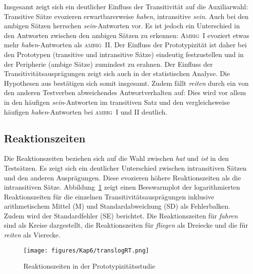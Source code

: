Insgesamt zeigt sich ein deutlicher Einfluss der Transitivität auf die Auxiliarwahl: Transitive Sätze evozieren erwartbarerweise \textit{haben}, intransitive \textit{sein}. Auch bei den ambigen Sätzen herrschen \textit{sein}-Antworten vor. Es ist jedoch ein Unterschied in den Antworten zwischen den ambigen Sätzen zu erkennen: \textsc{Ambig~I} evoziert etwas mehr \textit{haben}-Antworten als \textsc{ambig~II}. Der Einfluss der Prototypizität ist daher bei den Prototypen (transitive und intransitive Sätze) eindeutig festzustellen und in der Peripherie (ambige Sätze) zumindest zu erahnen. Der Einfluss der Transitivitätsausprägungen zeigt sich auch in der statistischen Analyse. Die Hypothesen aus  bestätigen sich somit insgesamt. Zudem fällt \textit{reiten} durch ein von den anderen Testverben abweichendes Antwortverhalten auf: Dies wird vor allem in den häufigen \textit{sein}-Antworten im transitiven Satz und den vergleichsweise häufigen \textit{haben}-Antworten bei \textsc{ambig}~\textsc{I} und \textsc{II} deutlich. 




\subsection{Reaktionszeiten}\label{rtprotokap}\largerpage[-1]

Die Reaktionszeiten beziehen sich auf die Wahl zwischen \textit{hat} und \textit{ist} in den Testsätzen. Es zeigt sich ein deutlicher Unterschied zwischen intransitiven Sätzen und den anderen Ausprägungen. Diese evozieren höhere Reaktionszeiten als die intransitiven Sätze. Abbildung~\ref{rtproto} zeigt einen Beeswarmplot der logarithmierten Reaktionszeiten für die einzelnen Transitivitätsausprägungen inklusive arithmetischem Mittel (M) und Standardabweichung (SD) als Fehlerbalken. Zudem wird der Standardfehler (SE) berichtet. Die Reaktionszeiten für \textit{fahren} sind als Kreise dargestellt, die Reaktionszeiten für \textit{fliegen} als Dreiecke und die für \textit{reiten} als Vierecke.

\begin{figure}
\texttt{[image: figures/Kap6/translogRT.png]} 
\caption{Reaktionszeiten in der Prototypizitätsstudie}
\label{rtproto}
\end{figure}

